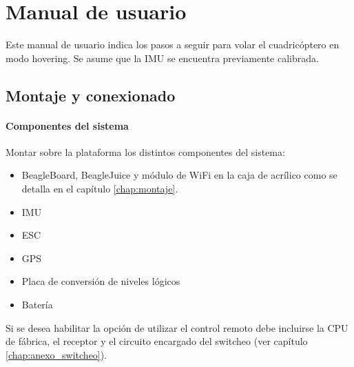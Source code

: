 \documentclass[main]{subfiles}
\begin{document}
\chapter{Manual de usuario}
\label{chap:anexo_manual}

Este manual de usuario indica los pasos a seguir para volar el cuadric\'optero en modo hovering. Se asume que la IMU se encuentra previamente calibrada. 

\section{Montaje y conexionado}

\subsubsection{Componentes del sistema}
Montar sobre la plataforma los distintos componentes del sistema:
\begin{itemize}
\item BeagleBoard, BeagleJuice y m\'odulo de WiFi en la caja de acr\'ilico como se detalla en el cap\'itulo \ref{chap:montaje}.
\item IMU
\item ESC
\item GPS
\item Placa de conversi\'on de niveles l\'ogicos
\item Bater\'ia
\end{itemize}
Si se desea habilitar la opci\'on de utilizar el control remoto debe incluirse la CPU de f\'abrica, el receptor y el circuito encargado del switcheo (ver cap\'itulo \ref{chap:anexo_switcheo}).
\end{document}

